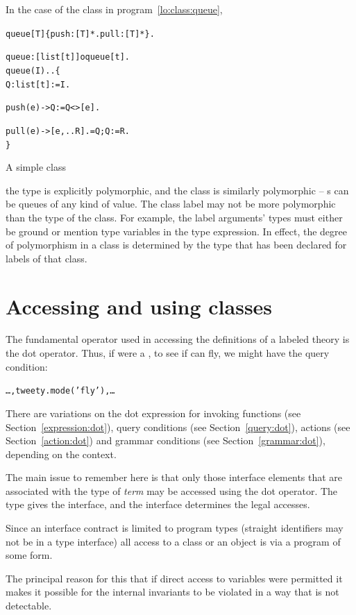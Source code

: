 In the case of the  class in program~\vref{lo:class:queue},
\begin{program}
\vspace{0.5ex}
\begin{alltt}
queue[T] \impl \{ push:[T]*. pull:[T]* \}.

queue:[list[t]]\sconarrow{}oqueue[t].
queue(I)..\{
  Q:list[t] := I.
  
  push(e) -> Q := Q<>[e].
    
  pull(e) -> [e,..R].=Q; Q := R.
\}
\end{alltt}
\vspace{-2ex}
\caption{A simple  class}
\label{lo:class:queue}
\end{program}
the  type is explicitly polymorphic, and the  class is similarly polymorphic -- s can be queues of any kind of value. The class label may not be more polymorphic than the type of the class. For example, the  label arguments' types must either be ground or mention type variables in the  type expression. In effect, the degree of polymorphism in a class is determined by the type that has been declared for labels of that class.


\section{Accessing and using classes}
\label{lo:access}

The fundamental operator used in accessing the definitions of a labeled theory is the dot operator. Thus, if  were a , to see if  can fly, we might have the query condition:
\begin{alltt}
\ldots,tweety.mode('fly'),\ldots
\end{alltt}
There are variations on the dot expression for invoking functions (see Section~\vref{expression:dot}), query conditions (see
Section~\vref{query:dot}), actions (see Section~\vref{action:dot}) and grammar conditions (see Section~\vref{grammar:dot}), depending on the context. 

The main issue to remember here is that only those interface elements that are associated with the type of \emph{term} may be accessed using the dot operator. The type gives the interface, and the interface determines the legal accesses.

Since an interface contract is limited to program types (straight identifiers may not be in a type interface) all access to a class or an object is via a program of some form.
\begin{aside}
The principal reason for this that if direct access to variables were permitted it makes it possible for the internal invariants to be violated in a way that is not detectable.
\end{aside}

